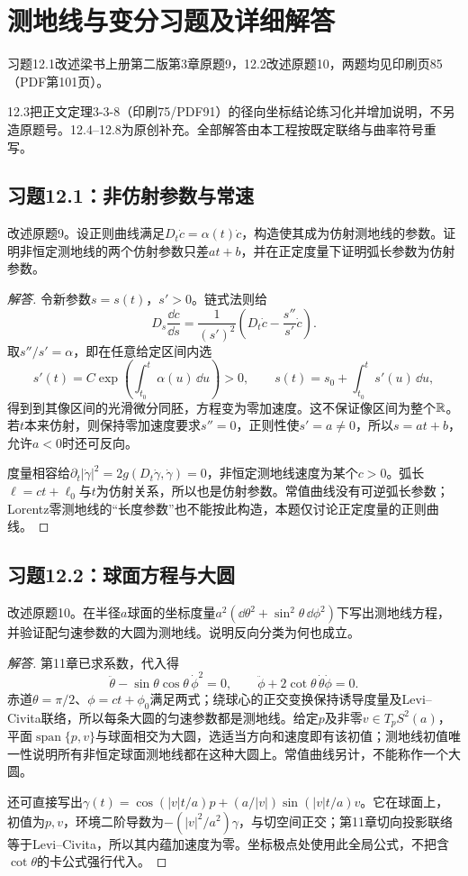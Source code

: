 \section{测地线与变分习题及详细解答}
习题12.1改述梁书上册第二版第3章原题9，12.2改述原题10，两题均见印刷页85（PDF第101页）。

12.3把正文定理3-3-8（印刷75/PDF91）的径向坐标结论练习化并增加说明，不另造原题号。12.4–12.8为原创补充。全部解答由本工程按既定联络与曲率符号重写。

\subsection*{习题12.1：非仿射参数与常速}
改述原题9。设正则曲线满足$D_t\dot c=\alpha(t)\dot c$，构造使其成为仿射测地线的参数。证明非恒定测地线的两个仿射参数只差$at+b$，并在正定度量下证明弧长参数为仿射参数。
\begin{proof}[解答]
令新参数$s=s(t)$，$s'>0$。链式法则给
\[
 D_s\frac{\dd c}{\dd s}
 =\frac1{(s')^2}\left(D_t\dot c-\frac{s''}{s'}\dot c\right).
\]
取$s''/s'=\alpha$，即在任意给定区间内选
\[
 s'(t)=C\exp\left(\int_{t_0}^t\alpha(u)\,\dd u\right)>0,
 \qquad s(t)=s_0+\int_{t_0}^t s'(u)\,\dd u,
\]
得到到其像区间的光滑微分同胚，方程变为零加速度。这不保证像区间为整个$\mathbb{R}$。若$t$本来仿射，则保持零加速度要求$s''=0$，正则性使$s'=a\ne0$，所以$s=at+b$，允许$a<0$时还可反向。

度量相容给$\partial_t|\dot\gamma|^2=2g(D_t\dot\gamma,\dot\gamma)=0$，非恒定测地线速度为某个$c>0$。弧长$\ell=ct+\ell_0$与$t$为仿射关系，所以也是仿射参数。常值曲线没有可逆弧长参数；Lorentz零测地线的“长度参数”也不能按此构造，本题仅讨论正定度量的正则曲线。
\end{proof}

\subsection*{习题12.2：球面方程与大圆}
改述原题10。在半径$a$球面的坐标度量$a^2(\dd\theta^2+\sin^2\theta\,\dd\phi^2)$下写出测地线方程，并验证配匀速参数的大圆为测地线。说明反向分类为何也成立。
\begin{proof}[解答]
第11章已求系数，代入得
\[
 \ddot\theta-\sin\theta\cos\theta\,\dot\phi^2=0,
 \qquad \ddot\phi+2\cot\theta\,\dot\theta\dot\phi=0.
\]
赤道$\theta=\pi/2$、$\phi=ct+\phi_0$满足两式；绕球心的正交变换保持诱导度量及Levi--Civita联络，所以每条大圆的匀速参数都是测地线。给定$p$及非零$v\in T_pS^2(a)$，平面$\operatorname{span}\{p,v\}$与球面相交为大圆，选适当方向和速度即有该初值；测地线初值唯一性说明所有非恒定球面测地线都在这种大圆上。常值曲线另计，不能称作一个大圆。

还可直接写出$\gamma(t)=\cos(|v|t/a)p+(a/|v|)\sin(|v|t/a)v$。它在球面上，初值为$p,v$，环境二阶导数为$-(|v|^2/a^2)\gamma$，与切空间正交；第11章切向投影联络等于Levi--Civita，所以其内蕴加速度为零。坐标极点处使用此全局公式，不把含$\cot\theta$的卡公式强行代入。
\end{proof}

